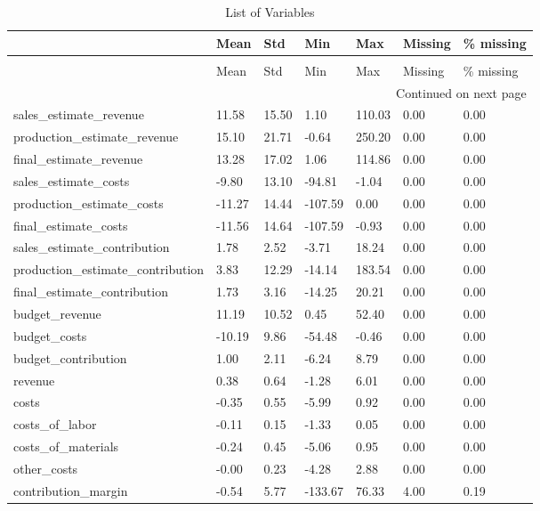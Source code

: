 \begin{landscape}\begin{longtable}[h!]{lllllll}
\caption{List of Variables} \label{eda_1} \\
\toprule
 & Mean & Std & Min & Max & Missing & \% missing \\
\midrule
\endfirsthead
\caption[]{List of Variables} \\
\toprule
 & Mean & Std & Min & Max & Missing & \% missing \\
\midrule
\endhead
\midrule
\multicolumn{7}{r}{Continued on next page} \\
\midrule
\endfoot
\bottomrule
\endlastfoot
sales_estimate_revenue & 11.58 & 15.50 & 1.10 & 110.03 & 0.00 & 0.00 \\
production_estimate_revenue & 15.10 & 21.71 & -0.64 & 250.20 & 0.00 & 0.00 \\
final_estimate_revenue & 13.28 & 17.02 & 1.06 & 114.86 & 0.00 & 0.00 \\
sales_estimate_costs & -9.80 & 13.10 & -94.81 & -1.04 & 0.00 & 0.00 \\
production_estimate_costs & -11.27 & 14.44 & -107.59 & 0.00 & 0.00 & 0.00 \\
final_estimate_costs & -11.56 & 14.64 & -107.59 & -0.93 & 0.00 & 0.00 \\
sales_estimate_contribution & 1.78 & 2.52 & -3.71 & 18.24 & 0.00 & 0.00 \\
production_estimate_contribution & 3.83 & 12.29 & -14.14 & 183.54 & 0.00 & 0.00 \\
final_estimate_contribution & 1.73 & 3.16 & -14.25 & 20.21 & 0.00 & 0.00 \\
budget_revenue & 11.19 & 10.52 & 0.45 & 52.40 & 0.00 & 0.00 \\
budget_costs & -10.19 & 9.86 & -54.48 & -0.46 & 0.00 & 0.00 \\
budget_contribution & 1.00 & 2.11 & -6.24 & 8.79 & 0.00 & 0.00 \\
revenue & 0.38 & 0.64 & -1.28 & 6.01 & 0.00 & 0.00 \\
costs & -0.35 & 0.55 & -5.99 & 0.92 & 0.00 & 0.00 \\
costs_of_labor & -0.11 & 0.15 & -1.33 & 0.05 & 0.00 & 0.00 \\
costs_of_materials & -0.24 & 0.45 & -5.06 & 0.95 & 0.00 & 0.00 \\
other_costs & -0.00 & 0.23 & -4.28 & 2.88 & 0.00 & 0.00 \\
contribution_margin & -0.54 & 5.77 & -133.67 & 76.33 & 4.00 & 0.19 \\

\end{longtable}
\end{landscape}
